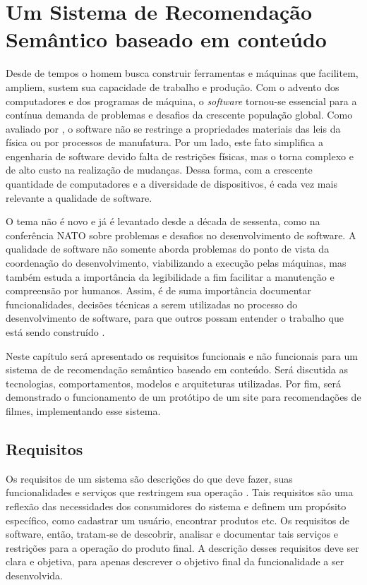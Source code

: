 \chapter{Um Sistema de Recomendação Semântico baseado em conteúdo}

Desde de tempos o homem busca construir ferramentas e máquinas que facilitem, ampliem, sustem sua capacidade de trabalho e produção. Com o advento dos computadores e dos programas de máquina, o \textit{software} tornou-se essencial para a contínua demanda de problemas e desafios da crescente população global. Como avaliado por \cite{Sommerville2010},  o software não se restringe a propriedades materiais das leis da física ou por processos de manufatura. Por um lado, este fato simplifica a engenharia de software devido falta de restrições físicas, mas o torna complexo e de alto custo na realização de mudanças. Dessa forma, com a crescente quantidade de computadores e a diversidade de dispositivos, é cada vez mais relevante a qualidade de software.

O tema não é novo e já é levantado desde a década de sessenta, como na conferência NATO \citep{NR68} sobre problemas e desafios no desenvolvimento de software. A qualidade de software não somente aborda problemas do ponto de vista da coordenação do desenvolvimento, viabilizando a execução pelas máquinas, mas também estuda a importância da legibilidade a fim facilitar a manutenção e compreensão por humanos. Assim, é de suma importância documentar funcionalidades, decisões técnicas a serem utilizadas no processo do desenvolvimento de software, para que outros possam entender o trabalho que está sendo construído \citep{Pressman2009}.

Neste capítulo será apresentado os requisitos funcionais e não funcionais para um sistema de de recomendação semântico baseado em conteúdo. Será discutida as tecnologias, comportamentos, modelos e arquiteturas utilizadas. Por fim, será demonstrado o funcionamento de um protótipo de um site para recomendações de filmes, implementando esse sistema.

\section{Requisitos}

Os requisitos de um sistema são descrições do que deve fazer, suas funcionalidades e serviços que restringem sua operação \citep{Sommerville2010}. Tais requisitos são uma reflexão das necessidades dos consumidores do sistema e definem um propósito específico, como cadastrar um usuário, encontrar produtos etc. Os requisitos de software, então, tratam-se de descobrir, analisar e documentar tais serviços e restrições para a operação do produto final. A descrição desses requisitos deve ser clara e objetiva, para apenas descrever o objetivo final da funcionalidade a ser desenvolvida.

